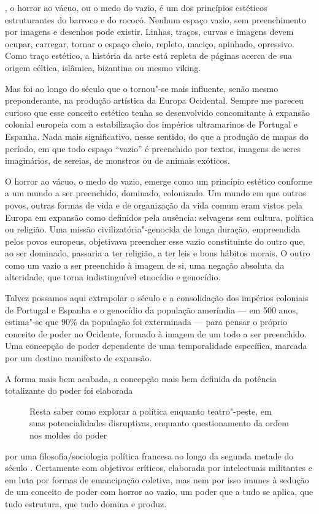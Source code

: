 \begin{multicols}{2}
{}, o horror ao vácuo, ou o medo do vazio, é um dos
princípios estéticos estruturantes do barroco e do rococó. Nenhum espaço
vazio, sem preenchimento por imagens e desenhos pode existir. Linhas,
traços, curvas e imagens devem ocupar, carregar, tornar o espaço cheio,
repleto, maciço, apinhado, opressivo. Como traço estético, a história da
arte está repleta de páginas acerca de sua origem céltica, islâmica,
bizantina ou mesmo viking.

Mas foi ao longo do século  que o {} tornou"-se mais
influente, senão mesmo preponderante, na produção artística da Europa
Ocidental. Sempre me pareceu curioso que esse conceito estético tenha se
desenvolvido concomitante à expansão colonial europeia com a
estabilização dos impérios ultramarinos de Portugal e Espanha. Nada mais
significativo, nesse sentido, do que a produção de mapas do período, em
que todo espaço ``vazio'' é preenchido por textos, imagens de seres
imaginários, de sereias, de monstros ou de animais exóticos.

O horror ao vácuo, o medo do vazio, emerge como um princípio estético
conforme a um mundo a ser preenchido, dominado, colonizado. Um mundo em
que outros povos, outras formas de vida e de organização da vida comum
eram vistos pela Europa em expansão como definidos pela ausência:
selvagens sem cultura, política ou religião. Uma missão
civilizatória"-genocida de longa duração, empreendida pelos povos
europeus, objetivava preencher esse vazio constituinte do outro que, ao
ser dominado, passaria a ter religião, a ter leis e bons hábitos morais.
O outro como um vazio a ser preenchido à imagem de si, uma negação
absoluta da alteridade, que torna indistinguível etnocídio e genocídio.

Talvez possamos aqui extrapolar o século  e a consolidação dos
impérios coloniais de Portugal e Espanha e o genocídio da população
ameríndia --- em 500 anos, estima"-se que 90\% da população foi exterminada
--- para pensar o próprio conceito de poder no Ocidente, formado à imagem
de um todo a ser preenchido. Uma concepção de poder dependente de uma
temporalidade específica, marcada por um destino manifesto de expansão.

A forma mais bem acabada, a concepção mais bem definida da potência
totalizante do poder foi elaborada
\begin{figure}
{\large
Resta saber como explorar a política enquanto teatro"-peste,
em suas potencialidades disruptivas, enquanto questionamento da
ordem nos moldes do poder
}
\end{figure}
por uma filosofia/sociologia
política francesa ao longo da segunda metade do século . Certamente
com objetivos críticos, elaborada por intelectuais militantes e em luta
por formas de emancipação coletiva, mas nem por isso imunes à sedução de
um conceito de poder com horror ao vazio, um poder que a tudo se aplica,
que tudo estrutura, que tudo domina e produz.


\end{multicols}
